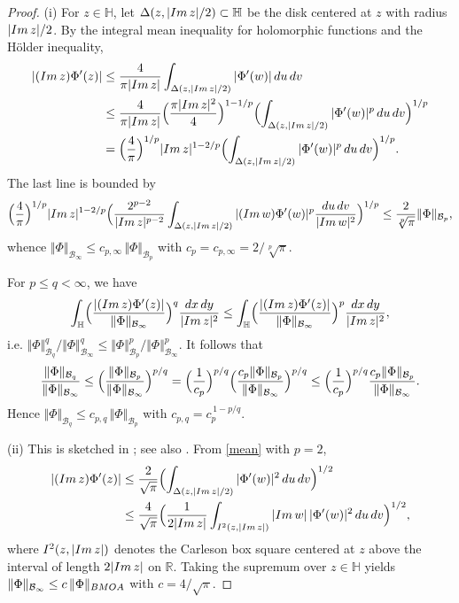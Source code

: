 \documentclass[amstex,12pt,reqno]{amsart}
\theoremstyle{definition}
\begin{document}
\begin{proof}
(i) 
For $z \in \mathbb H$,
let $\Delta(z,|{\rm Im}\,z|/2) \subset \mathbb H$ be the disk centered at $z$ with radius $|{\rm Im}\,z|/2$.
By the integral mean inequality for holomorphic functions and the H\"older inequality,
\begin{align}
|({\rm Im}\,z)\Phi'(z)| &\leq \frac{4}{\pi |{\rm Im}\,z|}\int_{\Delta(z,|{\rm Im}\,z|/2)}|\Phi'(w)|\,du\,dv\\
&\leq \frac{4}{\pi |{\rm Im}\,z|}\Bigl(\frac{\pi|{\rm Im}\,z|^2}{4} \Bigr)^{1-1/p}
\Bigl( \int_{\Delta(z,|{\rm Im}\,z|/2)}|\Phi'(w)|^p\,du\,dv \Bigr)^{1/p}\\
&=\Bigl(\frac{4}{\pi}\Bigr)^{1/p}|{\rm Im}\,z|^{1-2/p}\Bigl(\int_{\Delta(z,|{\rm Im}\,z|/2)}|\Phi'(w)|^p\,du\,dv \Bigr)^{1/p}.\label{mean}
\end{align}
The last line is bounded by
$$
\Bigl(\frac{4}{\pi}\Bigr)^{1/p}|{\rm Im}\,z|^{1-2/p}\Bigl(\frac{2^{p-2}}{|{\rm Im}\,z|^{p-2}} \int_{\Delta(z,|{\rm Im}\,z|/2)}|({\rm Im}\, w)\Phi'(w)|^p \frac{du\,dv}{|{\rm Im}\,w|^2} \Bigr)^{1/p} \leq \frac{2}{\sqrt[p]{\pi}}\Vert \Phi \Vert_{\mathcal B_p},
$$
whence $\Vert \Phi\Vert_{{\mathcal B}_\infty} \leq c_{p,\infty}\,\Vert \Phi\Vert_{{\mathcal B}_p}$
with $c_p=c_{p,\infty}=2/\sqrt[p]{\pi}$.

For $p \leq q<\infty$, we have
$$
\int_{\mathbb H}\Bigl( \frac{|({\rm Im}\,z)\Phi'(z)|}{\Vert \Phi \Vert_{\mathcal B_\infty}}\Bigr)^q \frac{dx\,dy}{|{\rm Im}\,z|^2}
\leq \int_{\mathbb H}\Bigl( \frac{|({\rm Im}\,z)\Phi'(z)|}{\Vert \Phi \Vert_{\mathcal B_\infty}}\Bigr)^p \frac{dx\,dy}{|{\rm Im}\,z|^2},
$$
i.e. $\Vert \Phi \Vert_{\mathcal B_q}^q/\Vert \Phi \Vert_{\mathcal B_\infty}^q \leq \Vert \Phi \Vert_{\mathcal B_p}^p/\Vert \Phi \Vert_{\mathcal B_\infty}^p$.
It follows that
$$
\frac{\Vert \Phi \Vert_{\mathcal B_q}}{\Vert \Phi \Vert_{\mathcal B_\infty}} 
\leq \Bigl(\frac{\Vert \Phi \Vert_{\mathcal B_p}}{\Vert \Phi \Vert_{\mathcal B_\infty}} \Bigr)^{p/q} 
= \Bigl( \frac{1}{c_p}\Bigr)^{p/q}\Bigl(\frac{c_p \Vert \Phi \Vert_{\mathcal B_p}}{\Vert \Phi \Vert_{\mathcal B_\infty}} \Bigr)^{p/q}
\leq \Bigl( \frac{1}{c_p}\Bigr)^{p/q} \frac{c_p \Vert \Phi \Vert_{\mathcal B_p}}{\Vert \Phi \Vert_{\mathcal B_\infty}}. 
$$
Hence
$
\Vert \Phi \Vert_{\mathcal B_q} 
\leq c_{p,q}\,\Vert \Phi \Vert_{\mathcal B_p}$
with $c_{p,q}=c_p^{\,1-p/q}$.

(ii) This is sketched in \cite[p.~92]{Sa}; see also \cite[Corollary~5.2]{Gi}. From \eqref{mean} with $p=2$,
\begin{align}
|({\rm Im}\,z)\Phi'(z)| 
&\leq \frac{2}{\sqrt{\pi}}\Bigl(\int_{\Delta(z,|{\rm Im}\,z|/2)}|\Phi'(w)|^2\,du\,dv \Bigr)^{1/2}\\
&\leq \frac{4}{\sqrt{\pi}}\Bigl(\frac{1}{2|{\rm Im}\,z|}\int_{I^2(z,|{\rm Im}\,z|)}|{\rm Im}\,w|\,|\Phi'(w)|^2\,du\,dv \Bigr)^{1/2},
\end{align}
where $I^2(z,|{\rm Im}\,z|)$ denotes the Carleson box square centered at $z$
above the interval of length $2|{\rm Im}\,z|$ on $\mathbb R$.
Taking the supremum over $z\in\mathbb H$ yields $\Vert \Phi\Vert_{{\mathcal B}_\infty} \leq c\,\Vert \Phi \Vert_{\rm BMOA}$ with $c=4/\sqrt{\pi}$.


\end{proof}
\end{document}
